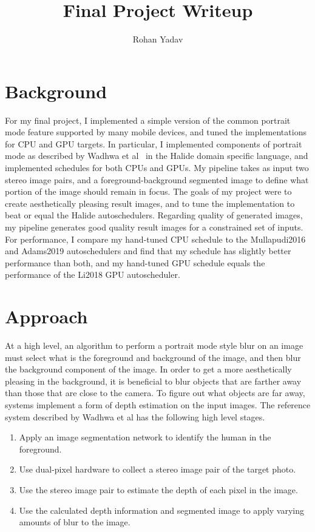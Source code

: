 \documentclass{article}
\author{Rohan Yadav}
\title{Final Project Writeup}
\date{}
\begin{document}
\maketitle

\section{Background}

For my final project, I implemented a simple version of the common portrait mode feature supported by many mobile devices, and tuned the implementations for CPU and GPU targets.
%
In particular, I implemented components of portrait mode as described by Wadhwa et al~\cite{portrait} in the Halide domain specific language, and implemented schedules for both CPUs and GPUs.
%
My pipeline takes as input two stereo image pairs, and a foreground-background segmented image to define what portion of the image should remain in focus.
%
The goals of my project were to create aesthetically pleasing result images, and to tune the implementation to beat or equal the Halide autoschedulers.
%
Regarding quality of generated images, my pipeline generates good quality result images for a constrained set of inputs.
%
For performance, I compare my hand-tuned CPU schedule to the Mullapudi2016 and Adams2019 autoschedulers and find that my schedule has slightly better performance than both, and my hand-tuned GPU schedule equals the performance of the Li2018 GPU autoscheduler.

\section{Approach}

At a high level, an algorithm to perform a portrait mode style blur on an image must select what is the foreground and 
background of the image, and then blur the background component of the image. 
%
In order to get a more aesthetically pleasing in the background, it is beneficial to blur objects that are farther away
than those that are close to the camera.
%
To figure out what objects are far away, systems implement a form of depth estimation on the input images.
%
The reference system described by Wadhwa et al has the following high level stages.
%
\begin{enumerate}
    \item Apply an image segmentation network to identify the human in the foreground.
    \item Use dual-pixel hardware to collect a stereo image pair of the target photo.
    \item Use the stereo image pair to estimate the depth of each pixel in the image.
    \item Use the calculated depth information and segmented image to apply varying amounts of blur to the image.
\end{enumerate}
\end{document}
